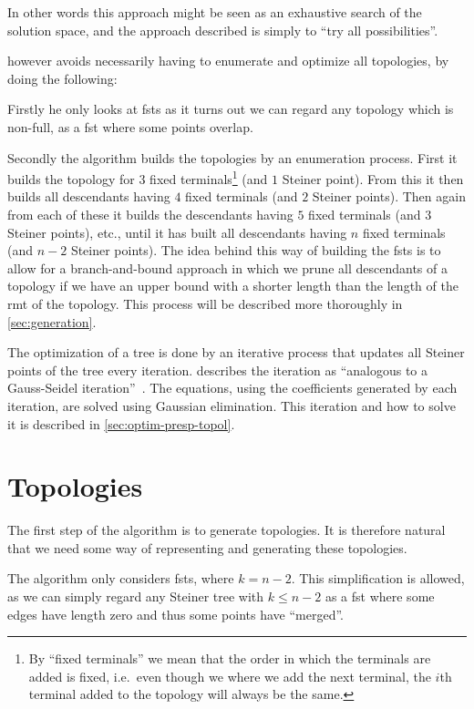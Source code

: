 In other words this approach might be seen as an exhaustive search of the
solution space, and the approach described is simply to ``try all
possibilities''.

\citeauthor{smith1992} however avoids necessarily having to enumerate and optimize all
topologies, by doing the following:

Firstly he only looks at \acp{fst} as it
turns out we can regard any topology which is non-full, as a \ac{fst} where
some points overlap.

Secondly the algorithm builds the topologies by an enumeration process. First it
builds the topology for $3$ fixed terminals\footnote{By ``fixed terminals'' we
  mean that the order in which the terminals are added is fixed, i.e.\ even
  though we where we add the next terminal, the $i$th terminal added to the
  topology will always be the same.} (and $1$ Steiner point). From this it then
builds all descendants having $4$ fixed terminals (and $2$ Steiner points). Then
again from each of these it builds the descendants having $5$ fixed terminals
(and $3$ Steiner points), etc., until it has built all descendants having $n$
fixed terminals (and $n-2$ Steiner points). The idea behind this way of building
the \acp{fst} is to allow for a branch-and-bound approach in which we prune all
descendants of a topology if we have an upper bound with a shorter length than
the length of the \ac{rmt} of the topology. This process will be described more
thoroughly in \cref{sec:generation}.

The optimization of a tree is done by an iterative process that updates all
Steiner points of the tree every iteration. \citeauthor{smith1992}
describes the iteration as ``analogous to a Gauss-Seidel
iteration''~\cite[p.~145]{smith1992}. The equations, using the coefficients
generated by each iteration, are solved using Gaussian elimination. This
iteration and how to solve it is described in \cref{sec:optim-presp-topol}.

\section{Topologies}
\label{sec:topologies}

The first step of the algorithm is to generate topologies. It is therefore
natural that we need some way of representing and generating these topologies.

The algorithm only considers \acp{fst}, where $k = n - 2$. This simplification
is allowed, as we can simply regard any Steiner tree with $k \le n - 2$ as a
\ac{fst} where some edges have length zero and thus some points have
``merged''.

